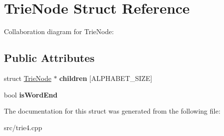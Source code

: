 \hypertarget{structTrieNode}{}\section{Trie\+Node Struct Reference}
\label{structTrieNode}


Collaboration diagram for Trie\+Node\+:
\subsection*{Public Attributes}
\begin{DoxyCompactItemize}
\item 
struct \hyperlink{structTrieNode}{Trie\+Node} $\ast$ {\bfseries children} \mbox{[}A\+L\+P\+H\+A\+B\+E\+T\+\_\+\+S\+I\+ZE\mbox{]}\hypertarget{structTrieNode_a9dc2a9bc247486fac3e4b350c73a3060}{}\label{structTrieNode_a9dc2a9bc247486fac3e4b350c73a3060}

\item 
bool {\bfseries is\+Word\+End}\hypertarget{structTrieNode_a4031b24973db8240ee3c29f5faaded04}{}\label{structTrieNode_a4031b24973db8240ee3c29f5faaded04}

\end{DoxyCompactItemize}


The documentation for this struct was generated from the following file\+:\begin{DoxyCompactItemize}
\item 
src/trie4.\+cpp\end{DoxyCompactItemize}
